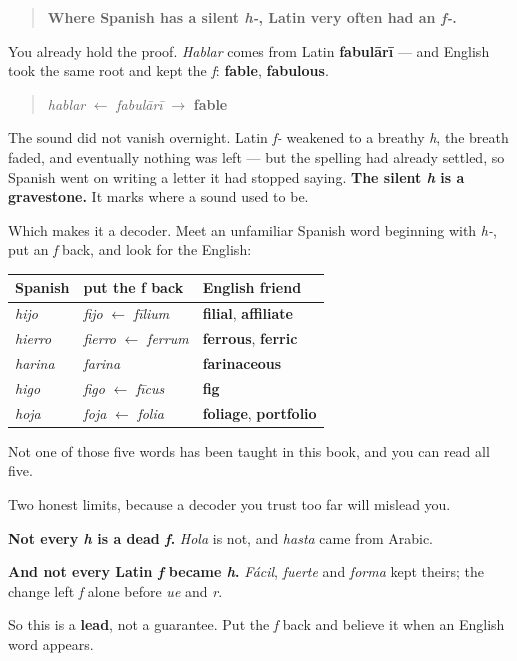 \begin{grammarlens}[title={Grammar Lens: a letter standing on a grave}]
\begin{quote}
\textbf{Where Spanish has a silent \emph{h-}, Latin very often had an \emph{f-}.}
\end{quote}

You already hold the proof. \emph{Hablar} comes from Latin \textbf{fabulārī} — and English took the same root and kept the \emph{f}: \textbf{fable}, \textbf{fabulous}.

\begin{quote}
\emph{hablar} $\leftarrow$ \emph{fabulārī} $\to$ \textbf{fable}
\end{quote}

The sound did not vanish overnight. Latin \emph{f-} weakened to a breathy \emph{h}, the breath faded, and eventually nothing was left — but the spelling had already settled, so Spanish went on writing a letter it had stopped saying. \textbf{The silent \emph{h} is a gravestone.} It marks where a sound used to be.

Which makes it a decoder. Meet an unfamiliar Spanish word beginning with \emph{h-}, put an \emph{f} back, and look for the English:

\noindent
\begin{tabularx}{\linewidth}{@{}>{\raggedright\arraybackslash}X>{\raggedright\arraybackslash}X>{\raggedright\arraybackslash}X@{}}
\toprule
\textbf{Spanish} & \textbf{put the f back} & \textbf{English friend} \\
\midrule
\emph{hijo} & \emph{fijo} $\leftarrow$ \emph{fīlium} & \textbf{filial}, \textbf{affiliate} \\
\emph{hierro} & \emph{fierro} $\leftarrow$ \emph{ferrum} & \textbf{ferrous}, \textbf{ferric} \\
\emph{harina} & \emph{farina} & \textbf{farinaceous} \\
\emph{higo} & \emph{figo} $\leftarrow$ \emph{fīcus} & \textbf{fig} \\
\emph{hoja} & \emph{foja} $\leftarrow$ \emph{folia} & \textbf{foliage}, \textbf{portfolio} \\
\bottomrule
\end{tabularx}

Not one of those five words has been taught in this book, and you can read all five.
\end{grammarlens}

\begin{culture}
Two honest limits, because a decoder you trust too far will mislead you.

\textbf{Not every \emph{h} is a dead \emph{f}.} \emph{Hola} is not, and \emph{hasta} came from Arabic.

\textbf{And not every Latin \emph{f} became \emph{h}.} \emph{Fácil}, \emph{fuerte} and \emph{forma} kept theirs; the change left \emph{f} alone before \emph{ue} and \emph{r}.

So this is a \textbf{lead}, not a guarantee. Put the \emph{f} back and believe it when an English word appears.
\end{culture}

